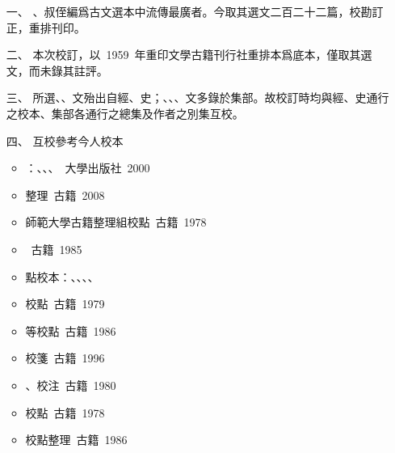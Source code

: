 \begin{enumerate}
    \item[一、] 、叔侄編爲古文選本中流傳最廣者。今取其選文二百二十二篇，校勘訂正，重排刊印。
    \item[二、] 本次校訂，以\ 1959\ 年重印文學古籍刊行社重排本爲底本，僅取其選文，而未錄其註評。
    \item[三、] 所選、、文殆出自經、史；、、、文多錄於集部。故校訂時均與經、史通行之校本、集部各通行之總集及作者之別集互校。
    \item[四、] 互校參考今人校本
    \begin{itemize}
        \item {}：、、、\ {\small {}大學出版社\ 2000}
        \item {}整理\ {\small {}古籍\ 2008}
        \item {}師範大學古籍整理組校點\ {\small {}古籍\ 1978}
        \item {}\ {\small {}古籍\ 1985}
        \item {}點校本：、、、、
        \item {}校點\ {\small {}古籍\ 1979}
        \item {}等校點\ {\small {}古籍\ 1986}
        \item {}校箋\ {\small {}古籍\ 1996}
        \item {}、校注\ {\small {}古籍\ 1980}
        \item {}校點\ {\small {}古籍\ 1978}
        \item {}校點整理\ {\small {}古籍\ 1986}

\end{itemize}
\end{enumerate}
